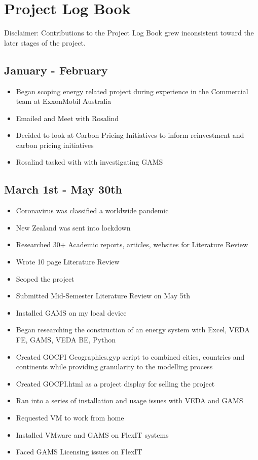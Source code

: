\documentclass[12pt]{article}
\begin{document}
\section{Project Log Book}
Disclaimer: Contributions to the Project Log Book grew inconsistent toward the later stages of the project.
\subsection{January - February}
\begin{itemize}
	\item Began scoping energy related project during experience in the Commercial team at ExxonMobil Australia
	\item Emailed and Meet with Rosalind
	\item Decided to look at Carbon Pricing Initiatives to inform reinvestment and carbon pricing initiatives
	\item Rosalind tasked with with investigating GAMS
\end{itemize}
\subsection{March 1st - May 30th}
\begin{itemize}
	\item Coronavirus was classified a worldwide pandemic
	\item New Zealand was sent into lockdown
	\item Researched 30+ Academic reports, articles, websites for Literature Review
	\item Wrote 10 page Literature Review
	\item Scoped the project
	\item Submitted Mid-Semester Literature Review on May 5th
	\item Installed GAMS on my local device
	\item Began researching the construction of an energy system with Excel, VEDA FE, GAMS, VEDA BE, Python
	\item Created GOCPI Geographies.gyp script to combined cities, countries and continents while providing granularity to the modelling process
	\item Created GOCPI.html as a project display for selling the project
	\item Ran into a series of installation and usage issues with VEDA and GAMS
	\item Requested VM to work from home
	\item Installed VMware and GAMS on FlexIT systems
	\item Faced GAMS Licensing issues on FlexIT
\end{itemize}
\end{document}
